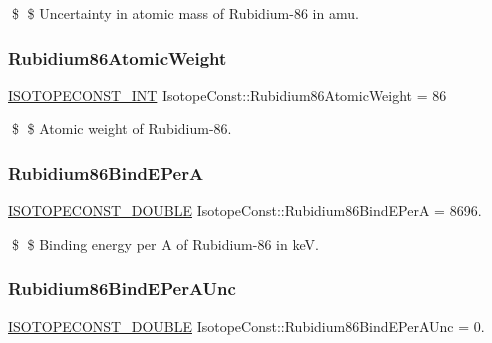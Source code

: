 \$ \$ Uncertainty in atomic mass of Rubidium-\/86 in amu. \mbox{\label{group___isotope_const-_rubidium-_rb86_ga191b10334ad749a60d05e65e3321b953}} 
\subsubsection{\texorpdfstring{Rubidium86\+Atomic\+Weight}{Rubidium86AtomicWeight}}
{\footnotesize\ttfamily \mbox{\hyperlink{group___isotope_const-_macros_ga5f18360b3e99483a35c32d789e62621c}{I\+S\+O\+T\+O\+P\+E\+C\+O\+N\+S\+T\+\_\+\+I\+NT}} Isotope\+Const\+::\+Rubidium86\+Atomic\+Weight = 86}

\$ \$ Atomic weight of Rubidium-\/86. \mbox{\label{group___isotope_const-_rubidium-_rb86_gad615542075e28d733c6b266d50661f23}} 
\subsubsection{\texorpdfstring{Rubidium86\+Bind\+E\+PerA}{Rubidium86BindEPerA}}
{\footnotesize\ttfamily \mbox{\hyperlink{group___isotope_const-_macros_ga8f45a7272ce02c0b4c65c44636ed719a}{I\+S\+O\+T\+O\+P\+E\+C\+O\+N\+S\+T\+\_\+\+D\+O\+U\+B\+LE}} Isotope\+Const\+::\+Rubidium86\+Bind\+E\+PerA = 8696.}

\$ \$ Binding energy per A of Rubidium-\/86 in keV. \mbox{\label{group___isotope_const-_rubidium-_rb86_ga2db714cbd18c52d870549c00f6b7b57b}} 
\subsubsection{\texorpdfstring{Rubidium86\+Bind\+E\+Per\+A\+Unc}{Rubidium86BindEPerAUnc}}
{\footnotesize\ttfamily \mbox{\hyperlink{group___isotope_const-_macros_ga8f45a7272ce02c0b4c65c44636ed719a}{I\+S\+O\+T\+O\+P\+E\+C\+O\+N\+S\+T\+\_\+\+D\+O\+U\+B\+LE}} Isotope\+Const\+::\+Rubidium86\+Bind\+E\+Per\+A\+Unc = 0.}

